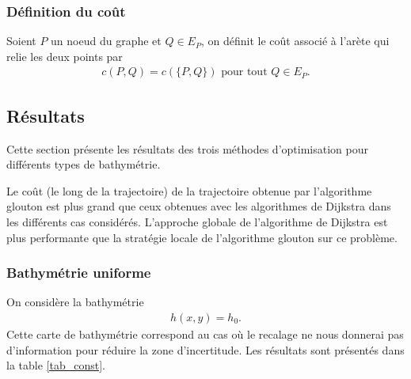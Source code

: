 \subsubsection{Définition du coût}
Soient $P$ un noeud du graphe et $Q\in E_P$, on définit le coût associé à l'arète qui relie les deux points par
\begin{align*}
c(P,Q)=c(\{P,Q\}) \text{ pour tout }Q\in E_P.
\end{align*}
\subsection{Résultats}
Cette section présente les résultats des trois méthodes d'optimisation pour différents types de bathymétrie.

Le coût (le long de la trajectoire) de la trajectoire obtenue par l'algorithme glouton est plus grand que ceux obtenues avec les algorithmes de Dijkstra dans les différents cas considérés. L'approche globale de l'algorithme de Dijkstra est plus performante que la stratégie locale de l'algorithme glouton sur ce problème.

\subsubsection{Bathymétrie uniforme}
On considère la bathymétrie
\begin{align*}
h(x,y)=h_0.
\end{align*}
Cette carte de bathymétrie correspond au cas où le recalage ne nous donnerai pas d'information pour réduire la zone d'incertitude. Les résultats sont présentés dans la table \ref{tab_const}. 

